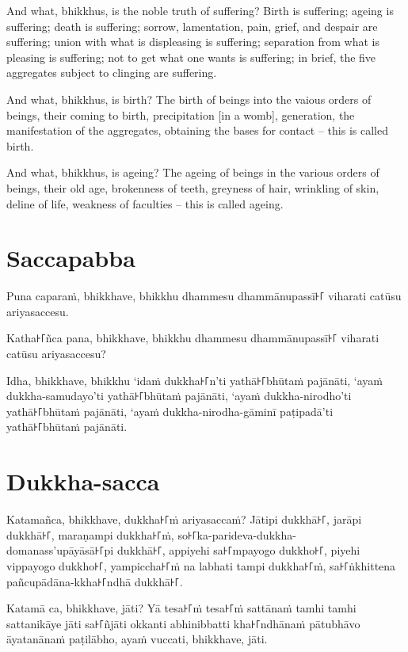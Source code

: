 And what, bhikkhus, is the noble truth of suffering? Birth is suffering; ageing
is suffering; death is suffering; sorrow, lamentation, pain, grief, and despair
are suffering; union with what is displeasing is suffering; separation from what
is pleasing is suffering; not to get what one wants is suffering; in brief, the
five aggregates subject to clinging are suffering.

And what, bhikkhus, is birth? The birth of beings into the vaious orders of
beings, their coming to birth, precipitation [in a womb], generation, the
manifestation of the aggregates, obtaining the bases for contact -- this is
called birth.

And what, bhikkhus, is ageing? The ageing of beings in the various orders of
beings, their old age, brokenness of teeth, greyness of hair, wrinkling of skin,
deline of life, weakness of faculties -- this is called ageing.

\paliPage

\section*{Saccapabba}

Puna caparaṁ, bhikkhave, bhikkhu dhammesu dhammānupassī꜔꜒ viharati catūsu
ariyasaccesu.

Katha꜔꜒ñca pana, bhikkhave, bhikkhu dhammesu dhammānupassī꜔꜒ viharati catūsu
ariyasaccesu?

Idha, bhikkhave, bhikkhu ‘idaṁ dukkha꜔꜒n’ti yathā꜔꜒bhūtaṁ pajānāti, ‘ayaṁ
dukkha-samudayo’ti yathā꜔꜒bhūtaṁ pajānāti, ‘ayaṁ dukkha-nirodho’ti yathā꜔꜒bhūtaṁ
pajānāti, ‘ayaṁ dukkha-nirodha-gāminī paṭipadā’ti yathā꜔꜒bhūtaṁ pajānāti.

\section*{Dukkha-sacca}

Katamañca, bhikkhave, dukkha꜔꜒ṁ ariyasaccaṁ? Jātipi dukkhā꜔꜒, jarāpi dukkhā꜔꜒,
maraṇampi dukkha꜔꜒ṁ, so꜔꜒ka-parideva-dukkha-\\ domanass'upāyāsā꜔꜒pi dukkhā꜔꜒, appiyehi
sa꜔꜒mpayogo dukkho꜔꜒, piyehi vippayogo dukkho꜔꜒, yampiccha꜔꜒ṁ na labhati tampi dukkha꜔꜒ṁ,
sa꜔꜒ṅkhittena pañcupādāna-kkha꜔꜒ndhā dukkhā꜔꜒.

Katamā ca, bhikkhave, jāti? Yā tesa꜔꜒ṁ tesa꜔꜒ṁ sattānaṁ tamhi tamhi sattanikāye jāti
sa꜔꜒ñjāti okkanti abhinibbatti kha꜔꜒ndhānaṁ pātubhāvo āyatanānaṁ paṭilābho, ayaṁ
vuccati, bhikkhave, jāti.

